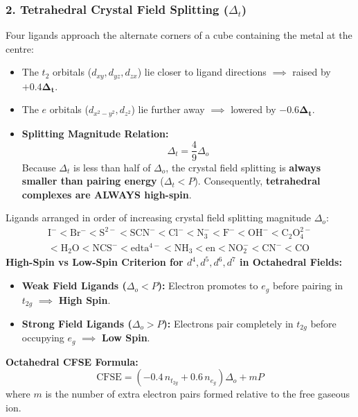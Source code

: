 \documentclass[10pt,a4paper]{article}
\begin{document}
\subsubsection{2. Tetrahedral Crystal Field Splitting ($\Delta_t$)}
Four ligands approach the alternate corners of a cube containing the metal at the centre:
\begin{itemize}
  \item The $t_2$ orbitals ($d_{xy}, d_{yz}, d_{zx}$) lie closer to ligand directions $\implies$ raised by $\mathbf{+0.4\Delta_t}$.
  \item The $e$ orbitals ($d_{x^2-y^2}, d_{z^2}$) lie further away $\implies$ lowered by $\mathbf{-0.6\Delta_t}$.
  \item \textbf{Splitting Magnitude Relation:}
  \begin{equation}
    \Delta_t = \frac{4}{9}\Delta_o
  \end{equation}
  Because $\Delta_t$ is less than half of $\Delta_o$, the crystal field splitting is \textbf{always smaller than pairing energy} ($\Delta_t < P$). Consequently, \textbf{tetrahedral complexes are ALWAYS high-spin}.
\end{itemize}

\begin{formulabox}
Ligands arranged in order of increasing crystal field splitting magnitude $\Delta_o$:
\begin{align}
  \mathrm{I^- < Br^- < S^{2-} < SCN^- < Cl^- < N_3^- < F^- < OH^- < C_2O_4^{2-}} \nonumber \\
  {} < \mathrm{H_2O < NCS^- < edta^{4-} < NH_3 < en < NO_2^- < CN^- < CO}
\end{align}
\textbf{High-Spin vs Low-Spin Criterion for $d^4, d^5, d^6, d^7$ in Octahedral Fields:}
\begin{itemize}
  \item \textbf{Weak Field Ligands ($\Delta_o < P$):} Electron promotes to $e_g$ before pairing in $t_{2g}$ $\implies$ \textbf{High Spin}.
  \item \textbf{Strong Field Ligands ($\Delta_o > P$):} Electrons pair completely in $t_{2g}$ before occupying $e_g$ $\implies$ \textbf{Low Spin}.
\end{itemize}
\textbf{Octahedral CFSE Formula:}
\begin{equation}
  \text{CFSE} = \left(-0.4\,n_{t_{2g}} + 0.6\,n_{e_g}\right)\Delta_o + m P
\end{equation}
where $m$ is the number of extra electron pairs formed relative to the free gaseous ion.
\end{formulabox}
\end{document}
